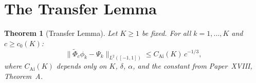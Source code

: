 \documentclass[12pt,a4paper]{amsart}
\newtheorem{theorem}{Theorem}[section]
\theoremstyle{definition}
\newcommand{\norm}[1]{\|#1\|}
\begin{document}
\section{The Transfer Lemma}
\label{sec:transfer}

\begin{theorem}[Transfer Lemma]\label{thm:transfer}
Let $K \ge 1$ be fixed.
For all $k = 1, \ldots, K$ and $c \ge c_0(K)$:
\begin{equation}\label{eq:transfer}
  \norm{\tilde{\Phi}_c \phi_k - \Psi_k}_{L^2([-1,1])}
  \le C_{\mathrm{Ai}}(K)\,c^{-1/3},
\end{equation}
where $C_{\mathrm{Ai}}(K)$ depends only on $K$, $\delta$, $\alpha$,
and the constant from Paper~\textnormal{XVIII}, Theorem~A.
\end{theorem}
\end{document}
